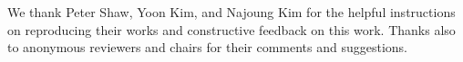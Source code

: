 We thank Peter Shaw, Yoon Kim, and Najoung Kim for the helpful instructions on reproducing their works and constructive feedback on this work. Thanks also to anonymous reviewers and chairs for their comments and suggestions.